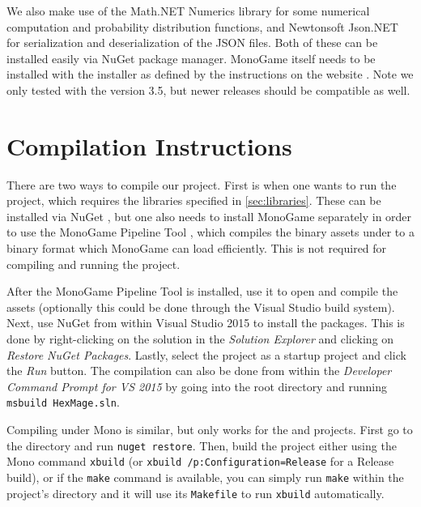 We also make use of the Math.NET Numerics \citep{math-dotnet} library for some numerical computation and probability distribution functions, and Newtonsoft Json.NET \citep{json-dotnet} for serialization and deserialization of the JSON files. Both of these can be installed easily via NuGet \citep{nuget} package manager. MonoGame itself needs to be installed with the installer as defined by the instructions on the website \citep{monogame}. Note we only tested with the version 3.5, but newer releases should be compatible as well.

\section{Compilation Instructions}
\label{sec:compilation}

There are two ways to compile our project. First is when one wants to run the  project, which requires the libraries specified in \autoref{sec:libraries}. These can be installed via NuGet \citep{nuget}, but one also needs to install MonoGame separately in order to use the MonoGame Pipeline Tool \citep{monogame-pipeline}, which compiles the binary assets under  to a binary format which MonoGame can load efficiently. This is not required for compiling and running the  project.

After the MonoGame Pipeline Tool is installed, use it to open  and compile the assets (optionally this could be done through the Visual Studio build system). Next, use NuGet from within Visual Studio 2015 to install the packages. This is done by right-clicking on the  solution in the \emph{Solution Explorer} and clicking on \emph{Restore NuGet Packages}. Lastly, select the  project as a startup project and click the \emph{Run} button. The compilation can also be done from within the \emph{Developer Command Prompt for VS 2015} by going into the root  directory and running \verb|msbuild HexMage.sln|.

Compiling under Mono is similar, but only works for the  and  projects. First go to the  directory and run \verb|nuget restore|. Then, build the project either using the Mono command \verb|xbuild| (or \verb|xbuild /p:Configuration=Release| for a Release build), or if the \verb|make| command is available, you can simply run \verb|make| within the project's directory and it will use its \verb|Makefile| to run \verb|xbuild| automatically.

